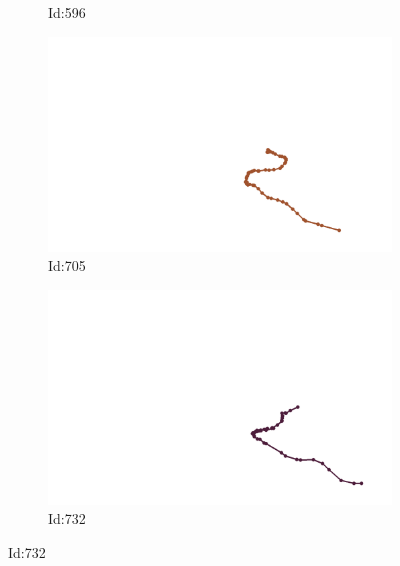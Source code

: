 \documentclass[12pt,twoside]{report}
\begin{document}
\begin{figure}
\begin{subfigure}[b]{0.20\textwidth}
\caption{Id:596}
\end{subfigure}
\begin{subfigure}[b]{0.20\textwidth}
\centering
\includegraphics[width=\textwidth]{../../trajectories/705.png}
\caption{Id:705}
\end{subfigure}
\begin{subfigure}[b]{0.20\textwidth}
\centering
\includegraphics[width=\textwidth]{../../trajectories/732.png}
\caption{Id:732}
\end{subfigure}
\end{figure}
\end{document}
